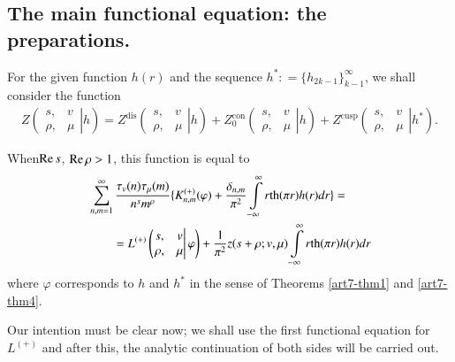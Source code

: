 \setcounter{section}{2}
\setcounter{equation}{0}
\subsection{The main functional equation: the preparations.}\label{art7-subsec2.3}

For the given function $h(r)$ and the sequence $h^\ast : = \{h_{2k-1}\}^\infty_{k-1}$, we shall consider the function
\setcounter{section}{4}
\setcounter{equation}{0}
\begin{align}
Z 
\left( 
\left. 
\begin{matrix}
s, & v\\
\rho, &\mu
\end{matrix}
\right| h
\right) = Z^{\text{dis}}
\left( 
\left. 
\begin{matrix}
s, & v\\
\rho, &\mu
\end{matrix}
\right| h
\right) + Z^{\text{con}}_0
\left( 
\left. 
\begin{matrix}
s, & v\\
\rho, &\mu
\end{matrix}
\right| h
\right) +Z^{\text{cusp}}
\left( 
\left. 
\begin{matrix}
s, & v\\
\rho, &\mu
\end{matrix}
\right| h^\ast
\right).
\label{art7-eq4.1}
\end{align}

When\pageoriginale $\operatorname{Re} s$, $\operatorname{Re} \rho>1$, this function is equal to 
\begin{align}
& \sum\limits^\infty_{n, m=1} \frac{\tau_v (n) \tau_\mu (m)}{n^s m^\rho} \{K^{(+)}_{n,m} (\varphi) + \frac{\delta_{n,m}}{\pi^2} \int\limits^\infty_{-\infty} r \text{th} (\pi r) h(r) dr \} = \label{art7-eq4.2}\\
&  \qquad =  L^{(+)} 
\left( 
\left. 
\begin{matrix}
s, & v\\
\rho, &\mu
\end{matrix}
\right| \varphi
\right) + \frac{1}{\pi^2} z (s+ \rho; v, \mu) \int\limits^\infty_{-\infty} r \text{th} (\pi r) h(r) dr \notag
\end{align}
where $\varphi$ corresponds to $h$ and $h^\ast$ in the sense of Theorems \ref{art7-thm1} and \ref{art7-thm4}.

Our intention must be clear now; we shall use the first functional equation for $L^{(+)}$ and after this, the analytic  continuation of both sides will be carried out. 


